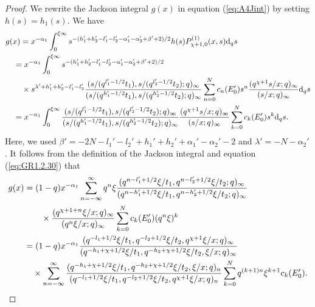 \documentclass[12pt]{amsart}
\numberwithin{equation}{section}
\theoremstyle{definition}
\theoremstyle{remark}
\begin{document}
\begin{proof}
We rewrite the Jackson integral $g(x)$ in equation (\ref{eq:A4Jint}) by setting $h(s)=h_1(s)$.
We have
   \begin{align*}
    & g(x) = x^{-\alpha_{1}} \int_{0}^{\xi \infty} s^{-(h_{1}' + h_{2}' - l_{1}' - l_{2}' - \alpha_{1}' - \alpha_{2}' + \beta' + 2)/2} h(s) P_{\chi +1, 0}^{(1)} (x, s) {\rm{d}}_{q}s \\
    & \quad = x^{-\alpha_{1}} \int_{0}^{\xi \infty} s^{-(h_{1}' + h_{2}' - l_{1}' - l_{2}' - \alpha_{1}' - \alpha_{2}' + \beta' + 2)/2} \\
    & \qquad \times s^{\lambda ' + h_{1}' + h_{2}' - l_{1}' - l_{2}'} \frac{(s/(q^{l_{1}' - 1/2}t_{1}), s/(q^{l_{2}' - 1/2}t_{2}); q)_\infty}{(s/(q^{h_{1}' - 1/2}t_{1}), s/(q^{h_{2}' - 1/2}t_{2}); q)_\infty} \sum_{n = 0}^{N} c_{n} (E'_0) s^{n} \frac{(q^{\chi +1} s/x; q)_{\infty}}{( s/x; q)_{\infty}} {\rm{d}}_{q}s \\
    & \quad = x^{-\alpha_{1}} \int_{0}^{\xi \infty} \frac{(s/(q^{l_{1}' - 1/2}t_{1}), s/(q^{l_{2}' - 1/2}t_{2}); q)_\infty}{(s/(q^{h_{1}' - 1/2}t_{1}), s/(q^{h_{2}' - 1/2}t_{2}); q)_\infty} \frac{(q^{\chi +1 } s/x; q)_{\infty}}{(s/x; q)_{\infty}}\sum_{k = 0}^{N} c_{k} (E'_0) s^{k} {\rm{d}}_{q}s .
  \end{align*}
Here, we used $\beta' = - 2N - l_{1}' - l_{2}' + h_{1}' + h_{2}' + \alpha_{1}' - \alpha_{2}' - 2$ and $\lambda ' = - N - \alpha_{2}'$.
It follows from the definition of the Jackson integral and equation (\ref{eq:GR1.2.30}) that
  \begin{align}
    g(x) &= (1 - q) x^{-\alpha_{1}} \sum_{n = -\infty}^{\infty} q^{n}\xi \frac{(q^{n - l_{1}' + 1/2}\xi/t_{1}, q^{n - l_{2}' + 1/2}\xi/t_{2}; q)_{\infty}}{(q^{n - h_{1}' + 1/2}\xi/t_{1}, q^{n - h_{2}' + 1/2}\xi/t_{2}; q)_\infty} \label{eq:polynom-J_Int} \\
    &\qquad \times \frac{(q^{\chi + 1 + n}\xi/x; q)_{\infty}}{(q^{n}\xi/x; q)_{\infty}} \sum_{k = 0}^{N} c_{k} (E'_0) (q^{n}\xi)^{k} \notag \\
 &= (1 - q) x^{-\alpha_{1}}\frac{(q^{- l_{1} + 1/2}\xi/t_{1}, q^{- l_{2} + 1/2}\xi/t_{2}, q^{\chi + 1}\xi/x; q)_{\infty}}{(q^{- h_{1} + \chi + 1/2}\xi/t_{1}, q^{- h_{2} + \chi + 1/2}\xi/t_{2}, \xi/x; q)_\infty} \notag \\
    &\quad \times \sum_{n = -\infty}^{\infty} \frac{(q^{- h_{1} + \chi + 1/2}\xi/t_{1}, q^{- h_{2} + \chi + 1/2}\xi/t_{2}, \xi/x; q)_{n}}{(q^{- l_{1} + 1/2}\xi/t_{1}, q^{- l_{2} + 1/2}\xi/t_{2}, q^{\chi + 1}\xi/x; q)_{n}} \sum_{k = 0}^{N} q^{(k+1)n} \xi^{k+1} c_{k}  (E'_0) . \notag

\end{align}
\end{proof}
\end{document}
